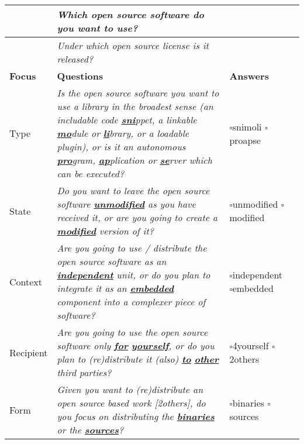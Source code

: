 \begin{small}
\begin{tabular}[h]{|l|l|l|l|}
\hline 
  \ & \textit{Which open source software do you want to use?} & \ \\
\hline 
  \ & \textit{Under which open source license is it released?} & \ \\
\hline
\hline 
\textbf{Focus} & \textbf{Questions} & \textbf{Answers}\\
\hline 
\hline 
  Type
  & \parbox[c][2.6cm][c]{10cm}{
    \textit{Is the open source software you want to use a library in the
    broadest sense (an includable code \textbf{\underline{sni}}ppet, a linkable
    \textbf{\underline{mo}}dule or \textbf{\underline{li}}brary, or a loadable
    plugin), or is it an autonomous \textbf{\underline{pro}}gram,
    \textbf{\underline{ap}}plication or \textbf{\underline{se}}rver which can be
    executed?}} & \parbox{7.5em}{
      $\square$\hspace{1em}snimoli\\
      $\square$\hspace{1em}proapse}
    \\
\hline 
  State & 
  \parbox[c][1.6cm][c]{10cm}{
  \textit{Do you want to leave the open source software
  \textbf{\underline{unmodified}} as you have received it, or are you going to
  create a \textbf{\underline{modified}} version of it?}} &
  \parbox{7.5em}{
    $\square$\hspace{1em}unmodified\\
    $\square$\hspace{1em}modified} \\
\hline 
  Context & 
  \parbox[c][1.6cm][c]{10cm}{
  \textit{Are you going to use / distribute the open source software as an
  \textbf{\underline{independent}} unit, or do you plan to integrate it as an
  \textbf{\underline{embedded}} component into a complexer piece of
  software?}} & \parbox{7.5em}{
  $\square$\hspace{1em}independent\\
    $\square$\hspace{1em}embedded}\\
\hline 
  Recipient & 
  \parbox[c][1.6cm][c]{10cm}{ \textit{Are you going to use the open source
  software only \textbf{\underline{for}} \textbf{\underline{yourself}}, or do
  you plan to (re)distribute it (also) \textbf{\underline{to}}
  \textbf{\underline{other}} third parties?}}
  & \parbox{7.5em}{
    $\square$\hspace{1em}4yourself\\
    $\square$\hspace{1em}2others}\\
\hline 
  Form & 
  \parbox[c][1.6cm][c]{10cm}{
  \textit{Given you want to (re)distribute an open source based work [2others],
  do you focus on distributing the \textbf{\underline{binaries}} or the
  \textbf{\underline{sources}}?}}
  & \parbox{7.5em}{
    $\square$\hspace{1em}binaries\\
    $\square$\hspace{1em}sources}\\
\hline 
\hline
\end{tabular}
\end{small}
